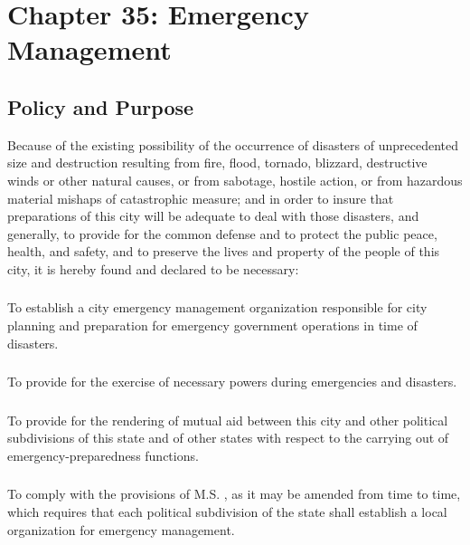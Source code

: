 \documentclass[code.tex]{subfiles}
\begin{document}
\chapter*{Chapter 35: \newline
	Emergency Management}

\section{Policy and Purpose}
Because of the existing possibility of the occurrence of disasters of unprecedented size and destruction resulting from fire, flood, tornado, blizzard, destructive winds or other natural causes, or from sabotage, hostile action, or from hazardous material mishaps of catastrophic measure; and in order to insure that preparations of this city will be adequate to deal with those disasters, and generally, to provide for the common defense and to protect the public peace, health, and safety, and to preserve the lives and property of the people of this city, it is hereby found and declared to be necessary:
\subsection{}
To establish a city emergency management organization responsible for city planning and preparation for emergency government operations in time of disasters.
\subsection{}
To provide for the exercise of necessary powers during emergencies and disasters.
\subsection{}
To provide for the rendering of mutual aid between this city and other political subdivisions of this state and of other states with respect to the carrying out of emergency-preparedness functions.
\subsection{}
To comply with the provisions of M.S. , as it may be amended from time to time, which requires that each political subdivision of the state shall establish a local organization for emergency management.
\end{document}
